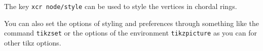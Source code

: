 \documentclass{article}
\begin{document}
The key \lstinline{xcr node/style} can be used to style the vertices in chordal rings.

\begin{LTXexample}[pos=r]
\end{LTXexample}

You can also set the options of styling and preferences through something like the command \lstinline{tikzset} or the options of the environment \lstinline{tikzpicture} as you can for other tikz options.


\begin{LTXexample}[pos=r]
\tikzset{xcr radius=15mm}

\end{LTXexample}

\begin{LTXexample}[pos=r]
\end{LTXexample}
\end{document}
